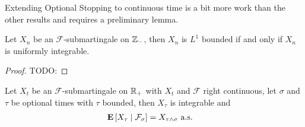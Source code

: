 Extending Optional Stopping to continuous time is a bit more work than
the other results and requires a preliminary lemma.  
\begin{lem}\label{BackwardSubmartingaleBoundedUniformlyIntegrable}Let $X_n$ be an $\mathcal{F}$-submartingale on
  $\integers_-$, then $X_n$ is $L^1$ bounded if and only if $X_n$ is
  uniformly integrable.
\end{lem}
\begin{proof}
TODO:
\end{proof}

\begin{thm}\label{OptionalStoppingContinuous}Let $X_t$ be an $\mathcal{F}$-submartingale on $\reals_+$
  with $X_t$ and $\mathcal{F}$ right continuous, let $\sigma$ and
  $\tau$ be optional times with $\tau$ bounded, then $X_\tau$ is
  integrable and
\begin{align*}
\cexpectationlong{\mathcal{F}_\sigma}{X_\tau} &= X_{\tau \wedge
  \sigma} \text{ a.s.}
\end{align*}
\end{thm}
